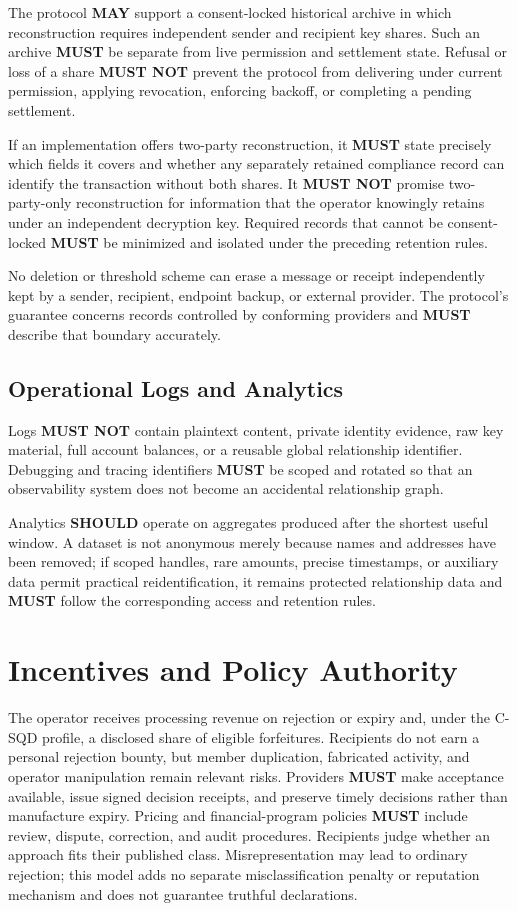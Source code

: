 \documentclass[11pt]{article}
\newcommand{\MUST}{\textbf{MUST}}
\newcommand{\MUSTNOT}{\textbf{MUST NOT}}
\newcommand{\SHOULD}{\textbf{SHOULD}}
\newcommand{\MAY}{\textbf{MAY}}
\begin{document}
The protocol \MAY{} support a consent-locked historical archive in which
reconstruction requires independent sender and recipient key shares. Such an
archive \MUST{} be separate from live permission and settlement state. Refusal or
loss of a share \MUSTNOT{} prevent the protocol from delivering under current
permission, applying revocation, enforcing backoff, or completing a pending
settlement.

If an implementation offers two-party reconstruction, it \MUST{} state precisely
which fields it covers and whether any separately retained compliance record can
identify the transaction without both shares. It \MUSTNOT{} promise two-party-only
reconstruction for information that the operator knowingly retains under an
independent decryption key. Required records that cannot be consent-locked \MUST{} be
minimized and isolated under the preceding retention rules.

No deletion or threshold scheme can erase a message or receipt independently kept
by a sender, recipient, endpoint backup, or external provider. The protocol's
guarantee concerns records controlled by conforming providers and \MUST{} describe
that boundary accurately.

\subsection{Operational Logs and Analytics}

Logs \MUSTNOT{} contain plaintext content, private identity evidence, raw key
material, full account balances, or a reusable global relationship identifier.
Debugging and tracing identifiers \MUST{} be scoped and rotated so that an
observability system does not become an accidental relationship graph.

Analytics \SHOULD{} operate on aggregates produced after the shortest useful
window. A dataset is not anonymous merely because names and addresses have been
removed; if scoped handles, rare amounts, precise timestamps, or auxiliary data
permit practical reidentification, it remains protected relationship data and
\MUST{} follow the corresponding access and retention rules.

\section{Incentives and Policy Authority}

The operator receives processing revenue on rejection or expiry and, under the
C-SQD profile, a disclosed share of eligible forfeitures. Recipients do not earn
a personal rejection bounty, but member duplication, fabricated activity, and
operator manipulation remain relevant risks. Providers \MUST{} make acceptance
available, issue signed decision receipts, and preserve timely decisions rather
than manufacture expiry. Pricing and financial-program policies \MUST{} include
review, dispute, correction, and audit procedures.
Recipients judge whether an approach fits their published class. Misrepresentation
may lead to ordinary rejection; this model adds no separate misclassification
penalty or reputation mechanism and does not guarantee truthful declarations.
\end{document}
